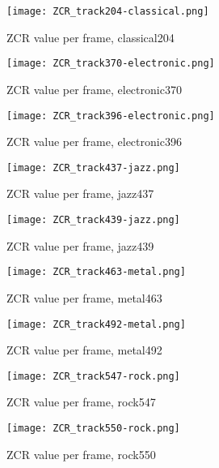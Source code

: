\documentclass{article} %
\begin{document}
\begin{figure}[!hb]
\centering
\texttt{[image: ZCR\_track204-classical.png]}
\caption{ZCR value per frame, classical204}
\label{fig:ZCR_204}
\end{figure}

\begin{figure}
\centering
\texttt{[image: ZCR\_track370-electronic.png]}
\caption{ZCR value per frame, electronic370}
\label{fig:ZCR_370}
\end{figure}

\begin{figure}
\centering
\texttt{[image: ZCR\_track396-electronic.png]}
\caption{ZCR value per frame, electronic396}
\label{fig:ZCR_396}
\end{figure}

\begin{figure}
\centering
\texttt{[image: ZCR\_track437-jazz.png]}
\caption{ZCR value per frame, jazz437}
\label{fig:ZCR_437}
\end{figure}

\begin{figure}
\centering
\texttt{[image: ZCR\_track439-jazz.png]}
\caption{ZCR value per frame, jazz439}
\label{fig:ZCR_439}
\end{figure}

\begin{figure}
\centering
\texttt{[image: ZCR\_track463-metal.png]}
\caption{ZCR value per frame, metal463}
\label{fig:ZCR_463}
\end{figure}


\begin{figure}
\centering
\texttt{[image: ZCR\_track492-metal.png]}
\caption{ZCR value per frame, metal492}
\label{fig:ZCR_492}
\end{figure}


\begin{figure}
\centering
\texttt{[image: ZCR\_track547-rock.png]}
\caption{ZCR value per frame, rock547}
\label{fig:ZCR_547}
\end{figure}


\begin{figure}
\centering
\texttt{[image: ZCR\_track550-rock.png]}
\caption{ZCR value per frame, rock550}
\label{fig:ZCR_550}
\end{figure}
\end{document}
